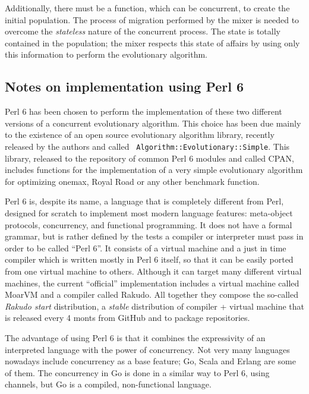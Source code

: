 \documentclass[sigconf]{acmart}
\begin{document}
Additionally, there must be a function, which can be concurrent, to
create the initial population. The process of migration performed by
the mixer is needed to overcome the {\em stateless}
nature of the concurrent process. The state is totally contained in
the population; the mixer respects this state of affairs by using only this information to perform the evolutionary algorithm.

\subsection{Notes on implementation using Perl 6}

Perl 6 \cite{Tang:2007:PRI:1190215.1190218} has been chosen to perform
the implementation of these two different versions of a concurrent
evolutionary algorithm. This choice has been due mainly to the
existence of an open source evolutionary algorithm library, recently
released by the authors and called {\tt
  Algorithm::Evolutionary::Simple}. This library, released to the
repository of common Perl 6 modules and called CPAN, includes
functions for the implementation of a very simple evolutionary
algorithm for optimizing onemax, Royal Road or any other benchmark
function.

Perl 6 \cite{lenzperl} is, despite its name, a language that is
completely different from Perl, designed for scratch to implement most
modern language features: meta-object protocols, concurrency, and
functional programming. It does not have a formal grammar, but is
rather defined by the tests a compiler or interpreter must pass in
order to be called ``Perl 6''. 
It consists of a virtual machine and a just in
time compiler which is written mostly in Perl 6 itself, so that it can
be easily ported from one virtual machine to others. Although it can
target many different virtual machines, the current ``official''
implementation includes a virtual machine called MoarVM and a compiler
called Rakudo. All together they compose the so-called {\em Rakudo
  start} distribution, a {\em stable} distribution of compiler +
virtual machine that is released every 4 monts from GitHub and to
package repositories. 

The advantage of using Perl 6 is that it combines the expressivity of
an interpreted language with the power of concurrency. Not very many
languages nowadays include concurrency as a base feature; Go, Scala
and Erlang are some of them. The concurrency in Go is done in a
similar way to Perl 6, using channels, but Go is a compiled,
non-functional language.
\end{document}
